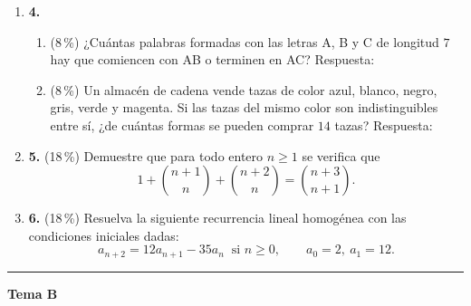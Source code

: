 \documentclass[11pt]{article}
\newcommand{\resp}{\underline{\hspace{3cm}}}
\begin{document}
\begin{enumerate}
\item[]\textbf{4.}
\begin{enumerate}[label=(\alph*)]
\item (8\,\%) ¿Cuántas palabras formadas con las letras A, B y C de longitud $7$ hay que comiencen con AB o terminen en AC? \hfill Respuesta: \resp
\item (8\,\%) Un almacén de cadena vende tazas de color azul, blanco, negro, gris, verde y magenta. Si las tazas del mismo color son indistinguibles entre sí, ¿de cuántas formas se pueden comprar $14$ tazas? \hfill Respuesta: \resp
\end{enumerate}

\item[]\textbf{5.} (18\,\%) Demuestre que para todo entero $n \geq 1$ se verifica que
\[
1 + \binom{n+1}{n} + \binom{n+2}{n} = \binom{n+3}{n+1}.
\]

\item[]\textbf{6.} (18\,\%) Resuelva la siguiente recurrencia lineal homogénea con las condiciones iniciales dadas:
\[
a_{n+2} = 12 a_{n+1} - 35 a_n \ \text{ si } n \geq 0, \qquad a_0 = 2,\ a_1 = 12.
\]
\end{enumerate}

\bigskip\hrule\medskip
\begin{center}\bfseries\large Tema B\end{center}
\end{document}
